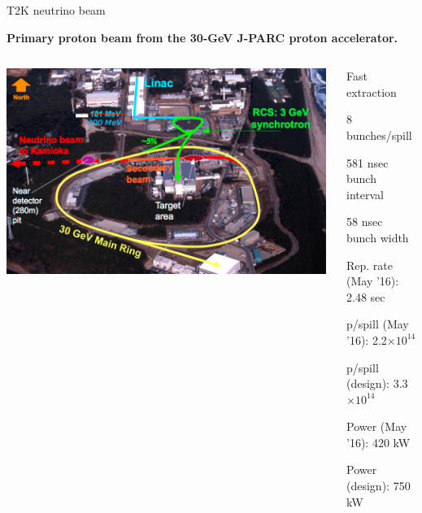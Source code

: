 %
%
%
\begin{frame}{T2K neutrino beam}

\begin{center}
  {\bf Primary proton beam from the 30-GeV J-PARC proton accelerator.}\\
\end{center}

\begin{columns}
  \begin{column}{0.75\textwidth}
     \includegraphics[width=0.99\textwidth]{./images/3nu/accelerator/t2k/jparc_facility_birds_eye_annotated.png}
  \end{column}
  \begin{column}{0.25\textwidth}
  \begin{itemize}
  {\scriptsize
    \item Fast extraction
    \item 8 bunches/spill
    \item 581 nsec bunch interval
    \item 58 nsec bunch width
    \item Rep. rate (May '16): 2.48 sec\\
    \item p/spill (May '16): 2.2$\times10^{14}$
    \item p/spill (design): 3.3$\times10^{14}$
    \item Power (May '16): 420 kW
    \item Power (design): 750 kW\\
  }
  \end{itemize}
  \end{column}
\end{columns}
\end{frame}

